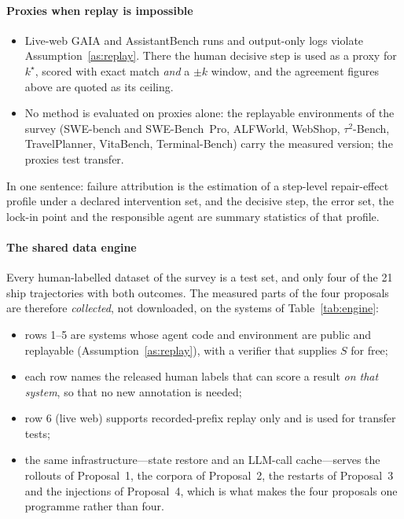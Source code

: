 \documentclass[10pt,a4paper]{article}
\begin{document}
\paragraph{Proxies when replay is impossible}
\begin{itemize}[leftmargin=1.1em]
\item Live-web GAIA and AssistantBench runs and output-only logs violate Assumption~\ref{as:replay}. There the human decisive step is used as a proxy for $k^\star$, scored with exact match \emph{and} a $\pm k$ window, and the agreement figures above are quoted as its ceiling.
\item No method is evaluated on proxies alone: the replayable environments of the survey (SWE-bench and SWE-Bench~Pro, ALFWorld, WebShop, $\tau^2$-Bench, TravelPlanner, VitaBench, Terminal-Bench) carry the measured version; the proxies test transfer.
\end{itemize}
In one sentence: failure attribution is the estimation of a step-level repair-effect profile under a declared intervention set, and the decisive step, the error set, the lock-in point and the responsible agent are summary statistics of that profile.

\paragraph{The shared data engine} Every human-labelled dataset of the survey is a test set, and only four of the 21 ship trajectories with both outcomes. The measured parts of the four proposals are therefore \emph{collected}, not downloaded, on the systems of Table~\ref{tab:engine}:
\begin{itemize}[leftmargin=1.1em]
\item rows 1--5 are systems whose agent code and environment are public and replayable (Assumption~\ref{as:replay}), with a verifier that supplies $S$ for free;
\item each row names the released human labels that can score a result \emph{on that system}, so that no new annotation is needed;
\item row 6 (live web) supports recorded-prefix replay only and is used for transfer tests;
\item the same infrastructure---state restore and an LLM-call cache---serves the rollouts of Proposal~1, the corpora of Proposal~2, the restarts of Proposal~3 and the injections of Proposal~4, which is what makes the four proposals one programme rather than four.
\end{itemize}
\end{document}
